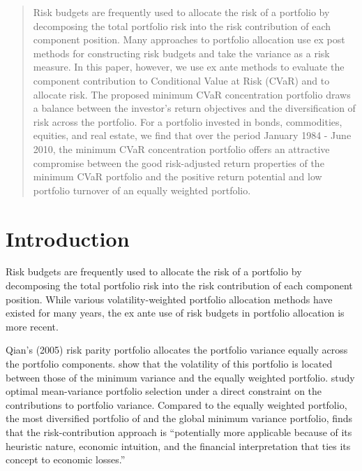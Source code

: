\documentclass[12pt,a4paper]{article}
\renewcommand{\baselinestretch}{1.3}
\begin{document}
\renewcommand{\baselinestretch}{1}
\begin{abstract}
Risk budgets are frequently used to allocate the risk of a portfolio by decomposing the total portfolio risk into the risk contribution of each component position. Many approaches to portfolio allocation use ex post methods for constructing risk budgets and take the variance as a risk measure. In this paper, however, we use ex ante methods to evaluate the component contribution to Conditional Value at Risk (CVaR) and to allocate risk. The proposed minimum CVaR concentration portfolio draws a balance between the investor's return objectives and the diversification of risk across the portfolio. For a portfolio invested in bonds, commodities, equities, and real estate, we find that over the period January 1984 - June 2010, the minimum CVaR concentration portfolio offers an attractive compromise between the good risk-adjusted return properties of the minimum CVaR portfolio and the positive return potential and low portfolio turnover of an equally weighted portfolio.
\end{abstract}


\newpage
\renewcommand{\baselinestretch}{1.3}

\section{Introduction}

Risk budgets are frequently used to allocate the risk of a portfolio by decomposing the total portfolio risk into the risk contribution of each component position.  While various volatility-weighted portfolio allocation methods have existed for many years, the ex ante use of risk budgets in portfolio allocation is more recent.

\nocite{Qian2005} Qian's (2005) risk parity portfolio allocates the portfolio variance equally across the portfolio components. \citet{Maillard2010} show that the volatility of this portfolio is located between those of the minimum variance and the equally weighted portfolio. \citet{Zhu2010} study optimal mean-variance portfolio selection under a direct constraint on the contributions to portfolio variance. Compared to the equally weighted portfolio, the most diversified portfolio of \citet{MDP2008} and the global minimum variance portfolio, \citet{Lee2011} finds that the risk-contribution approach is ``potentially more applicable because of its heuristic nature, economic intuition, and the financial interpretation that ties its concept to economic losses.''
\end{document}
